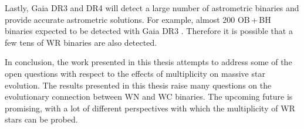 Lastly, Gaia DR3 and DR4 will detect a large number of astrometric binaries and provide accurate astrometric solutions. For example, almost 200 OB\,+\,BH binaries expected to be detected with Gaia DR3 \citep{2022Janssens}. Therefore it is possible that a few tens of WR binaries are also detected.

In conclusion, the work presented in this thesis attempts to address some of the open questions with respect to the effects of multiplicity on massive star evolution. The results presented in this thesis raise many questions on the evolutionary connection between WN and WC binaries. The upcoming future is promising, with a lot of different perspectives with which the multiplicity of WR stars can be probed.


